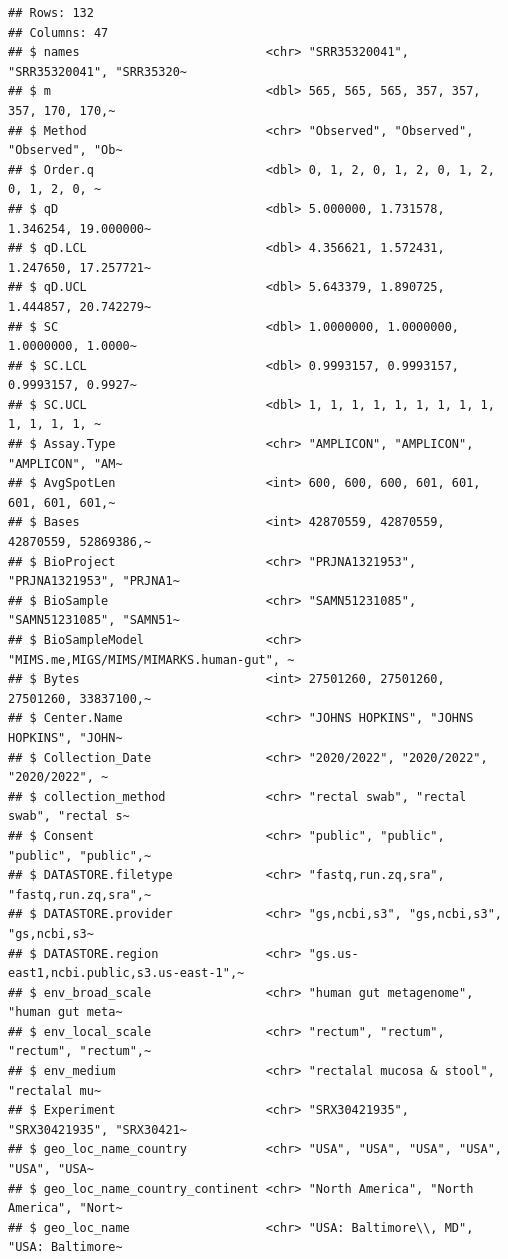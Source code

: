 \documentclass[
]{article}
\begin{document}
\begin{verbatim}
## Rows: 132
## Columns: 47
## $ names                          <chr> "SRR35320041", "SRR35320041", "SRR35320~
## $ m                              <dbl> 565, 565, 565, 357, 357, 357, 170, 170,~
## $ Method                         <chr> "Observed", "Observed", "Observed", "Ob~
## $ Order.q                        <dbl> 0, 1, 2, 0, 1, 2, 0, 1, 2, 0, 1, 2, 0, ~
## $ qD                             <dbl> 5.000000, 1.731578, 1.346254, 19.000000~
## $ qD.LCL                         <dbl> 4.356621, 1.572431, 1.247650, 17.257721~
## $ qD.UCL                         <dbl> 5.643379, 1.890725, 1.444857, 20.742279~
## $ SC                             <dbl> 1.0000000, 1.0000000, 1.0000000, 1.0000~
## $ SC.LCL                         <dbl> 0.9993157, 0.9993157, 0.9993157, 0.9927~
## $ SC.UCL                         <dbl> 1, 1, 1, 1, 1, 1, 1, 1, 1, 1, 1, 1, 1, ~
## $ Assay.Type                     <chr> "AMPLICON", "AMPLICON", "AMPLICON", "AM~
## $ AvgSpotLen                     <int> 600, 600, 600, 601, 601, 601, 601, 601,~
## $ Bases                          <int> 42870559, 42870559, 42870559, 52869386,~
## $ BioProject                     <chr> "PRJNA1321953", "PRJNA1321953", "PRJNA1~
## $ BioSample                      <chr> "SAMN51231085", "SAMN51231085", "SAMN51~
## $ BioSampleModel                 <chr> "MIMS.me,MIGS/MIMS/MIMARKS.human-gut", ~
## $ Bytes                          <int> 27501260, 27501260, 27501260, 33837100,~
## $ Center.Name                    <chr> "JOHNS HOPKINS", "JOHNS HOPKINS", "JOHN~
## $ Collection_Date                <chr> "2020/2022", "2020/2022", "2020/2022", ~
## $ collection_method              <chr> "rectal swab", "rectal swab", "rectal s~
## $ Consent                        <chr> "public", "public", "public", "public",~
## $ DATASTORE.filetype             <chr> "fastq,run.zq,sra", "fastq,run.zq,sra",~
## $ DATASTORE.provider             <chr> "gs,ncbi,s3", "gs,ncbi,s3", "gs,ncbi,s3~
## $ DATASTORE.region               <chr> "gs.us-east1,ncbi.public,s3.us-east-1",~
## $ env_broad_scale                <chr> "human gut metagenome", "human gut meta~
## $ env_local_scale                <chr> "rectum", "rectum", "rectum", "rectum",~
## $ env_medium                     <chr> "rectalal mucosa & stool", "rectalal mu~
## $ Experiment                     <chr> "SRX30421935", "SRX30421935", "SRX30421~
## $ geo_loc_name_country           <chr> "USA", "USA", "USA", "USA", "USA", "USA~
## $ geo_loc_name_country_continent <chr> "North America", "North America", "Nort~
## $ geo_loc_name                   <chr> "USA: Baltimore\\, MD", "USA: Baltimore~

\end{verbatim}
\end{document}
